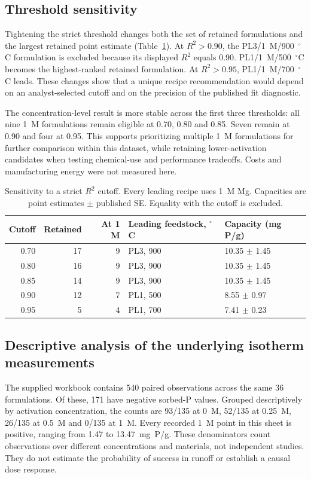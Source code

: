 \documentclass[11pt,letterpaper]{article}
\begin{document}
\subsection{Threshold sensitivity}
Tightening the strict threshold changes both the set of retained formulations and the largest retained point estimate (Table~\ref{tab:sensitivity}). At $R^2>0.90$, the PL3/1~M/900~$^\circ$C formulation is excluded because its displayed $R^2$ equals 0.90. PL1/1~M/500~$^\circ$C becomes the highest-ranked retained formulation. At $R^2>0.95$, PL1/1~M/700~$^\circ$C leads. These changes show that a unique recipe recommendation would depend on an analyst-selected cutoff and on the precision of the published fit diagnostic.

The concentration-level result is more stable across the first three thresholds: all nine 1~M formulations remain eligible at 0.70, 0.80 and 0.85. Seven remain at 0.90 and four at 0.95. This supports prioritizing multiple 1~M formulations for further comparison within this dataset, while retaining lower-activation candidates when testing chemical-use and performance tradeoffs. Costs and manufacturing energy were not measured here.

\begin{table}[htbp]
\centering\small
\caption{Sensitivity to a strict $R^2$ cutoff. Every leading recipe uses 1~M Mg. Capacities are point estimates $\pm$ published SE. Equality with the cutoff is excluded.}
\label{tab:sensitivity}
\begin{tabular}{@{}rrrll@{}}
\toprule
Cutoff & Retained & At 1 M & Leading feedstock, $^\circ$C & Capacity (mg P/g)\\
\midrule
0.70 & 17 & 9 & PL3, 900 & 10.35 $\pm$ 1.45 \\
0.80 & 16 & 9 & PL3, 900 & 10.35 $\pm$ 1.45 \\
0.85 & 14 & 9 & PL3, 900 & 10.35 $\pm$ 1.45 \\
0.90 & 12 & 7 & PL1, 500 & 8.55 $\pm$ 0.97 \\
0.95 & 5 & 4 & PL1, 700 & 7.41 $\pm$ 0.23 \\
\bottomrule
\end{tabular}
\end{table}

\subsection{Descriptive analysis of the underlying isotherm measurements}
The supplied workbook contains 540 paired observations across the same 36 formulations. Of these, 171 have negative sorbed-P values. Grouped descriptively by activation concentration, the counts are 93/135 at 0~M, 52/135 at 0.25~M, 26/135 at 0.5~M and 0/135 at 1~M. Every recorded 1~M point in this sheet is positive, ranging from 1.47 to 13.47~mg~P/g. These denominators count observations over different concentrations and materials, not independent studies. They do not estimate the probability of success in runoff or establish a causal dose response.
\end{document}
